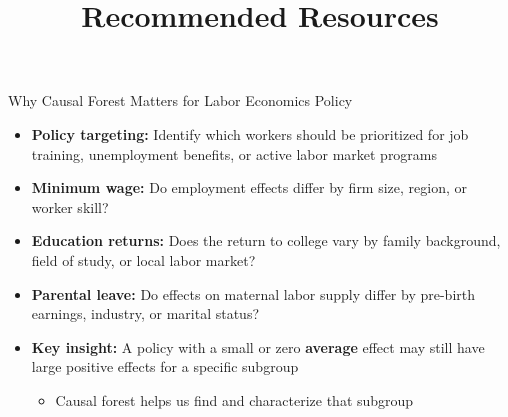 \documentclass[dvipsnames,hyperref={pdfpagelabels=false}]{beamer}
\begin{document}
\begin{frame}{Why Causal Forest Matters for Labor Economics Policy}
	\begin{itemize}
		\item \textbf{Policy targeting:} Identify which workers should be prioritized for job training, unemployment benefits, or active labor market programs
		\vspace{0.3cm}
		\item \textbf{Minimum wage:} Do employment effects differ by firm size, region, or worker skill?
		\vspace{0.3cm}
		\item \textbf{Education returns:} Does the return to college vary by family background, field of study, or local labor market?
		\vspace{0.3cm}
		\item \textbf{Parental leave:} Do effects on maternal labor supply differ by pre-birth earnings, industry, or marital status?
		\vspace{0.3cm}
		\item \textbf{Key insight:} A policy with a small or zero \textbf{average} effect may still have large positive effects for a specific subgroup
		\vspace{0.2cm}
		\begin{itemize}
			\item Causal forest helps us find and characterize that subgroup
		\end{itemize}
	\end{itemize}
\end{frame}




\title[]
{Recommended Resources}

\author{}
\institute{}
\date{}

\begin{frame}{}
	\titlepage
\end{frame}
\end{document}
